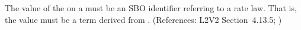 The value of the   on a \KineticLaw must be an SBO
identifier referring to a rate law.  That is, the value must be a term
derived from \sboratelaw.  (References: L2V2 Section~4.13.5; )
